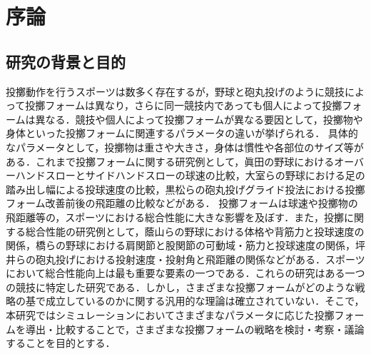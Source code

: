 \chapter[序論]%
        {序論}
        \section{研究の背景と目的}
        投擲動作を行うスポーツは数多く存在するが，野球と砲丸投げのように競技によって投擲フォームは異なり，さらに同一競技内であっても個人によって投擲フォームは異なる．競技や個人によって投擲フォームが異なる要因として，投擲物や身体といった投擲フォームに関連するパラメータの違いが挙げられる．
        具体的なパラメータとして，投擲物は重さや大きさ，身体は慣性や各部位のサイズ等がある．これまで投擲フォームに関する研究例として，眞田の野球におけるオーバーハンドスローとサイドハンドスローの球速の比較\cite{sanada}，大室らの野球における足の踏み出し幅による投球速度の比較\cite{omuro}，黒松らの砲丸投げグライド投法における投擲フォーム改善前後の飛距離の比較\cite{kuromatsu}などがある．
        投擲フォームは球速や投擲物の飛距離等の，スポーツにおける総合性能に大きな影響を及ぼす．また，投擲に関する総合性能の研究例として，蔭山らの野球における体格や背筋力と投球速度の関係\cite{kageyama}，橋らの野球における肩関節と股関節の可動域・筋力と投球速度の関係\cite{takahashi}，坪井らの砲丸投げにおける投射速度・投射角と飛距離の関係\cite{tsuboi}などがある．スポーツにおいて総合性能向上は最も重要な要素の一つである．これらの研究はある一つの競技に特定した研究である．しかし，さまざまな投擲フォームがどのような戦略の基で成立しているのかに関する汎用的な理論は確立されていない．そこで，本研究ではシミュレーションにおいてさまざまなパラメータに応じた投擲フォームを導出・比較することで，さまざまな投擲フォームの戦略を検討・考察・議論することを目的とする．\\

